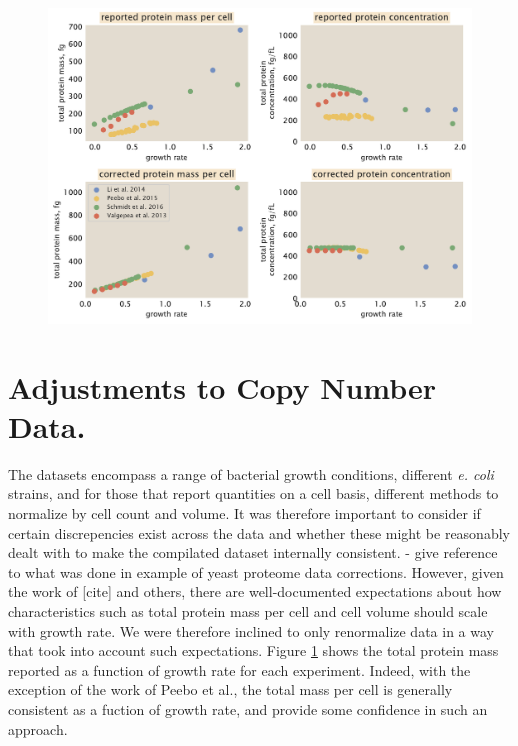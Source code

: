 \documentclass[11pt]{article}
\begin{document}
\begin{figure}[H]
		\centering
    \includegraphics[width=1\textwidth]{../../figures/dataset_corrections.pdf}
  \caption{}
  \label{fig:dataset_correlations}
\end{figure}


\section{Adjustments to Copy Number Data.}



The datasets encompass a range of bacterial growth conditions,  different {\it
e. coli} strains, and for those that report quantities on a cell basis,
different methods to normalize  by  cell count and volume. It was therefore
important to consider if certain discrepencies exist across the data and whether
these might be reasonably dealt with to make the compilated dataset internally
consistent. - give reference to what was done in example of yeast proteome data
corrections. However, given the work of [cite] and others, there are
well-documented expectations about how characteristics such as total protein
mass per cell and cell volume  should scale with growth rate. We were therefore
inclined to only renormalize data in a  way  that took into account such
expectations. Figure \ref{} shows the total protein  mass reported as a function
of growth rate for each experiment. Indeed, with the exception of the work of
Peebo et al., the total mass per cell is generally consistent as a fuction of
growth rate, and provide some confidence in such an approach.
\end{document}
